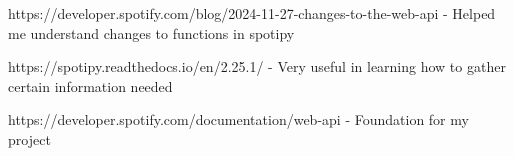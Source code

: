 https://developer.spotify.com/blog/2024-11-27-changes-to-the-web-api 
- Helped me understand changes to functions in spotipy

https://spotipy.readthedocs.io/en/2.25.1/
- Very useful in learning how to gather certain information needed

https://developer.spotify.com/documentation/web-api
- Foundation for my project
